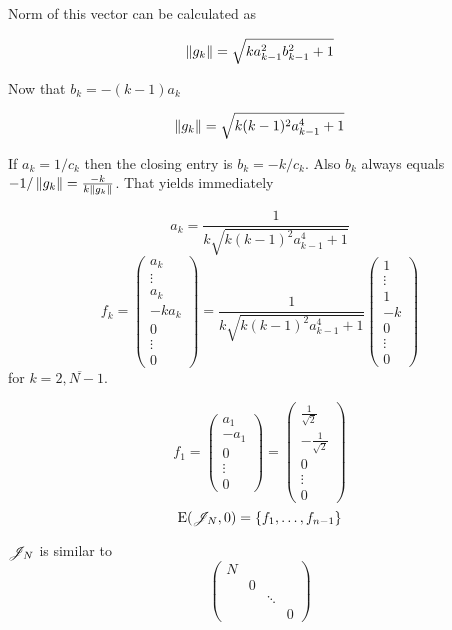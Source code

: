 \documentclass{article}
\begin{document}
Norm of this vector can be calculated as

\providecommand{\fknorm}{\sqrt{k a_{k-1}^2 b_{k-1}^2 + 1}}
\[\norm{g_k} = \fknorm\]

Now that \( b_k = -(k-1)a_k \)

\renewcommand{\fknorm}{\sqrt{k(k-1)^2 a_{k-1}^4 + 1}}
\[\norm{g_k} = \fknorm\]

If \( a_k = 1/c_k \) then the closing entry is \( b_k = -k/c_k \).
Also \( b_k \) always equals \( -1/\left\|{g_k}\right\| = \frac{-k}{k\left\|{g_k}\right\|} \).
That yields immediately

\begin{propose}
    \[a_k = \frac{1}{k\fknorm}\]
    \[f_k =
    \begin{pmatrix}a_k \\ \vdots \\ a_k \\ -ka_k \\ 0 \\ \vdots \\ 0 \end{pmatrix} =
    \frac{1}{k\fknorm}
    \begin{pmatrix}1 \\ \vdots \\ 1 \\ -k \\ 0 \\ \vdots \\ 0 \end{pmatrix}\]
        for \( k=\overline{2,N-1} \).

    \[f_1
    = \begin{pmatrix}a_1 \\ -a_1 \\ 0 \\ \vdots \\ 0 \end{pmatrix}
        = \begin{pmatrix}\frac1{\sqrt2} \\ - \frac{1}{\sqrt2} \\ 0 \\ \vdots \\ 0 \end{pmatrix}
            \]
    \[\mathrm{E}({\mathscr{J}_{N}}, {0}) = \{ f_1, \ldots, f_{n-1} \}\]

    \( \mathscr{J}_{N} \) is similar to
    \[\begin{pmatrix}
        N &   &        & \\
        & 0 &        & \\
        &   & \ddots & \\
        &   &        & 0
    \end{pmatrix}\]


\end{propose}
\end{document}
